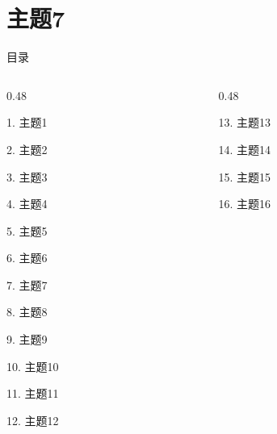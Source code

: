 \documentclass[aspectratio=169,10pt,fontset=fandol]{ctexbeamer}
\begin{document}
\section{主题7}
\begin{frame}[t,fragile]{目录}
\small
\begin{columns}[T,onlytextwidth]
\begin{column}{0.48\textwidth}
{\color{black}\small 1. 主题1\par}\vspace{0.22em}
{\color{black}\small 2. 主题2\par}\vspace{0.22em}
{\color{black}\small 3. 主题3\par}\vspace{0.22em}
{\color{black}\small 4. 主题4\par}\vspace{0.22em}
{\color{black}\small 5. 主题5\par}\vspace{0.22em}
{\color{black}\small 6. 主题6\par}\vspace{0.22em}
{\color{blue}\small 7. 主题7\par}\vspace{0.22em}
{\color{gray!40}\small 8. 主题8\par}\vspace{0.22em}
{\color{gray!40}\small 9. 主题9\par}\vspace{0.22em}
{\color{gray!40}\small 10. 主题10\par}\vspace{0.22em}
{\color{gray!40}\small 11. 主题11\par}\vspace{0.22em}
{\color{gray!40}\small 12. 主题12\par}\vspace{0.22em}
\end{column}
\begin{column}{0.48\textwidth}
{\color{gray!40}\small 13. 主题13\par}\vspace{0.22em}
{\color{gray!40}\small 14. 主题14\par}\vspace{0.22em}
{\color{gray!40}\small 15. 主题15\par}\vspace{0.22em}
{\color{gray!40}\small 16. 主题16\par}\vspace{0.22em}

\end{column}
\end{columns}
\end{frame}
\end{document}

